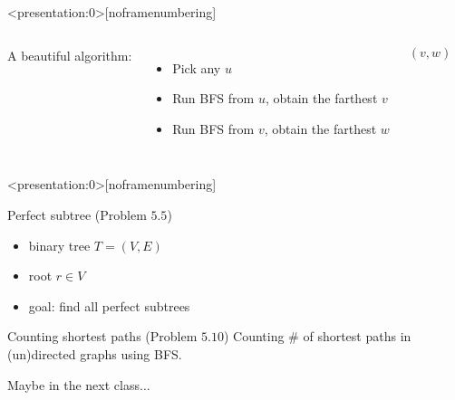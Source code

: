 \begin{frame}<presentation:0>[noframenumbering]
  \centerline{}

  \pause
  \vspace{0.80cm}
  \begin{columns}
      {\large A beautiful algorithm:}
      \begin{itemize}
	\item Pick any $u$
	\item Run BFS from $u$, obtain the farthest $v$
	\item Run BFS from $v$, obtain the farthest $w$
      \end{itemize}
      \[
	(v, w)
      \]
    \pause
      \centerline{}
  \end{columns}

  \pause
  \vspace{0.50cm}
  \centerline{}
\end{frame}

\begin{frame}<presentation:0>[noframenumbering]
  \begin{exampleblock}{Perfect subtree (Problem $5.5$)}
    \begin{itemize}
      \item binary tree $T = (V, E)$
      \item root $r \in V$
      \item goal: find all perfect subtrees
    \end{itemize}
  \end{exampleblock}
\end{frame}

\begin{frame}{}
  \begin{exampleblock}{Counting shortest paths (Problem $5.10$)}
    Counting \# of shortest paths in (un)directed graphs using BFS.
  \end{exampleblock}

  \pause
  \vspace{0.50cm}
  \centerline{Maybe in the next class$\dots$}
\end{frame}

